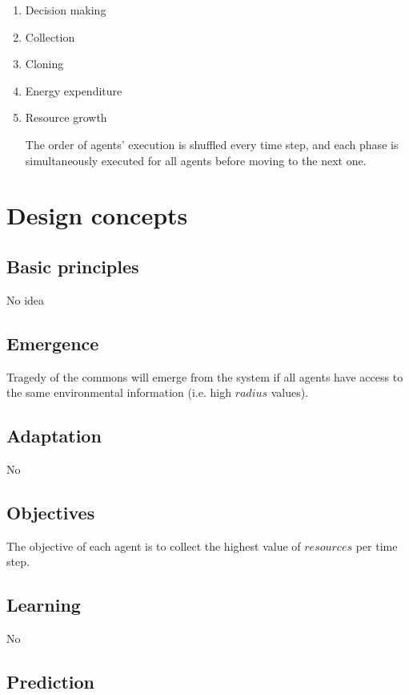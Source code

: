\message{ !name(odd_decision_making.tex)}\documentclass[11pt,a4paper,twocolumn,notitlepage]{article}
\begin{document}
\begin{enumerate}
\item{Decision making}
\item{Collection}
\item{Cloning}
\item{Energy expenditure}
\item{Resource growth}

The order of agents' execution is shuffled every time step, and each phase is simultaneously executed for all agents before moving to the next one.

\end{enumerate}

\section{Design concepts}

\subsection{Basic principles}

No idea

\subsection{Emergence}

Tragedy of the commons will emerge from the system if all agents have access to the same environmental information (i.e. high $radius$ values).

\subsection{Adaptation}

No

\subsection{Objectives}

The objective of each agent is to collect the highest value of $resources$ per time step.

\subsection{Learning}

No

\subsection{Prediction}
\end{document}
